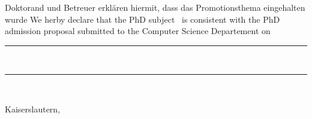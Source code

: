 \vspace*{2cm}
\ifusegerman
{Doktorand und Betreuer erkl\"{a}ren hiermit, dass das Promotionsthema eingehalten wurde}
{We herby declare that the PhD subject \RRLABVARtitle~is consistent with the PhD admission proposal submitted to the Computer Science Departement on \RRLABVARadmissiondate}

\vspace*{3cm}

\parbox{8cm}{\rule{5cm}{1pt}\\\makeatletter\RRLABVARauthor\makeatother} \parbox{8cm}{\rule{5cm}{1pt}\\\RRLABVARfirstreviewer}

\vspace*{1.5cm}

\noindent Kaiserslautern, \RRLABVARdeclarationdate
